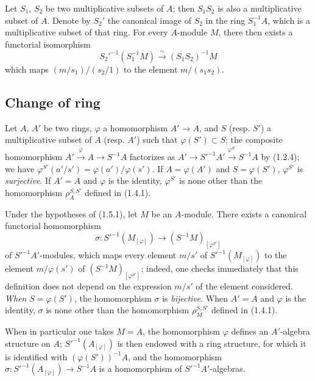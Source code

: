 \begin{env}[1.4.6]
\label{0.1.4.6}
Let $S_1$, $S_2$ be two multiplicative subsets of $A$; then $S_1S_2$ is also a multiplicative subset of $A$.
Denote by $S_2'$ the canonical image of $S_2$ in the ring $S_1^{-1}A$, which is a multiplicative subset of that ring.
For every $A$-module $M$, there then exists a functorial isomorphism
\[
  S_2'^{-1}(S_1^{-1}M)\xrightarrow{\sim}(S_1S_2)^{-1}M
\]
which maps $(m/s_1)/(s_2/1)$ to the element $m/(s_1s_2)$.
\end{env}

\subsection{Change of ring}
\label{subsection:0.1.5}

\begin{env}[1.5.1]
\label{0.1.5.1}
Let $A$, $A'$ be two rings, $\varphi$ a homomorphism $A'\to A$, and $S$ (resp. $S'$) a multiplicative subset of $A$ (resp. $A'$) such that $\varphi(S')\subset S$; the composite homomorphism $A'\xrightarrow{\varphi}A\longrightarrow S^{-1}A$
factorizes as $A'\longrightarrow S'^{-1}A'\xrightarrow{\varphi^{S'}}S^{-1}A$
by (1.2.4); we have $\varphi^{S'}(a'/s')=\varphi(a')/\varphi(s')$.
If $A=\varphi(A')$ and $S=\varphi(S')$, $\varphi^{S'}$ is \emph{surjective}.
If $A'=A$ and $\varphi$ is the identity, $\varphi^{S'}$ is none other than the homomorphism $\rho_A^{S,S'}$ defined in (1.4.1).
\end{env}

\begin{env}[1.5.2]
\label{0.1.5.2}
Under the hypotheses of (1.5.1), let $M$ be an $A$-module.
There exists a canonical functorial homomorphism
\[
  \sigma:S'^{-1}(M_{[\varphi]})\longrightarrow
  (S^{-1}M)_{[\varphi^{S'}]}
\]
of $S'^{-1}A'$-modules, which maps every element $m/s'$ of $S'^{-1}(M_{[\varphi]})$ to the element $m/\varphi(s')$ of $(S^{-1}M)_{[\varphi^{S'}]}$; indeed, one checks immediately that this definition does not depend on the expression $m/s'$ of the element considered.
\emph{When} $S=\varphi(S')$, the homomorphism $\sigma$ is \emph{bijective}.
When $A'=A$ and $\varphi$ is the identity, $\sigma$ is none other than the homomorphism $\rho_M^{S,S'}$ defined in (1.4.1).

When in particular one takes $M=A$, the homomorphism $\varphi$ defines an $A'$-algebra structure on $A$; $S'^{-1}(A_{[\varphi]})$ is then endowed with a ring structure, for which it is identified with $(\varphi(S'))^{-1}A$, and the homomorphism $\sigma:S'^{-1}(A_{[\varphi]})\longrightarrow S^{-1}A$
is a homomorphism of $S'^{-1}A'$-algebras.
\end{env}

